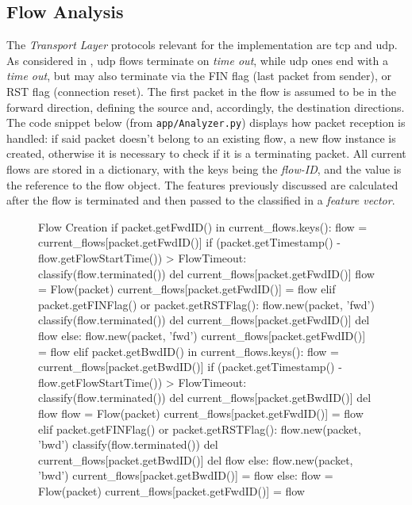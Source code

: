 \subsection{Flow Analysis}
\label{subsec:flow-analysis}

The \textit{Transport Layer} protocols relevant for the implementation are \gls{tcp} and \gls{udp}. As considered in \cite{Mozley2020}, \gls{udp} flows terminate on \textit{time out}, while \gls{udp} ones end with a \textit{time out}, but may also terminate via the FIN flag (last packet from sender), or RST flag (connection reset). The first packet in the flow is assumed to be in the forward direction, defining the source and, accordingly, the destination directions. \\ The code snippet below (from \texttt{app/Analyzer.py}) displays how packet reception is handled: if said packet doesn't belong to an existing flow, a new flow instance is created, otherwise it is necessary to check if it is a terminating packet. All current flows are stored in a dictionary, with the keys being the \textit{flow-ID}, and the value is the reference to the flow object. The features previously discussed are calculated after the flow is terminated and then passed to the classified in a \textit{feature vector}.

\begin{figure}[h!]
    \begin{code}[colback=white]{Flow Creation}
if packet.getFwdID() in current_flows.keys():
  flow = current_flows[packet.getFwdID()]
  if (packet.getTimestamp() - flow.getFlowStartTime()) > FlowTimeout:
    classify(flow.terminated())
    del current_flows[packet.getFwdID()]
    flow = Flow(packet)
    current_flows[packet.getFwdID()] = flow
  elif packet.getFINFlag() or packet.getRSTFlag():
    flow.new(packet, 'fwd')
    classify(flow.terminated())
    del current_flows[packet.getFwdID()]
    del flow
  else:
    flow.new(packet, 'fwd')
    current_flows[packet.getFwdID()] = flow
elif packet.getBwdID() in current_flows.keys():
  flow = current_flows[packet.getBwdID()]
  if (packet.getTimestamp() - flow.getFlowStartTime()) > FlowTimeout:
    classify(flow.terminated())
    del current_flows[packet.getBwdID()]
    del flow
    flow = Flow(packet)
    current_flows[packet.getFwdID()] = flow
  elif packet.getFINFlag() or packet.getRSTFlag():
    flow.new(packet, 'bwd')
    classify(flow.terminated())
    del current_flows[packet.getBwdID()]
    del flow
  else:
    flow.new(packet, 'bwd')
    current_flows[packet.getBwdID()] = flow
else:
  flow = Flow(packet)
  current_flows[packet.getFwdID()] = flow
\end{code}
\end{figure}

